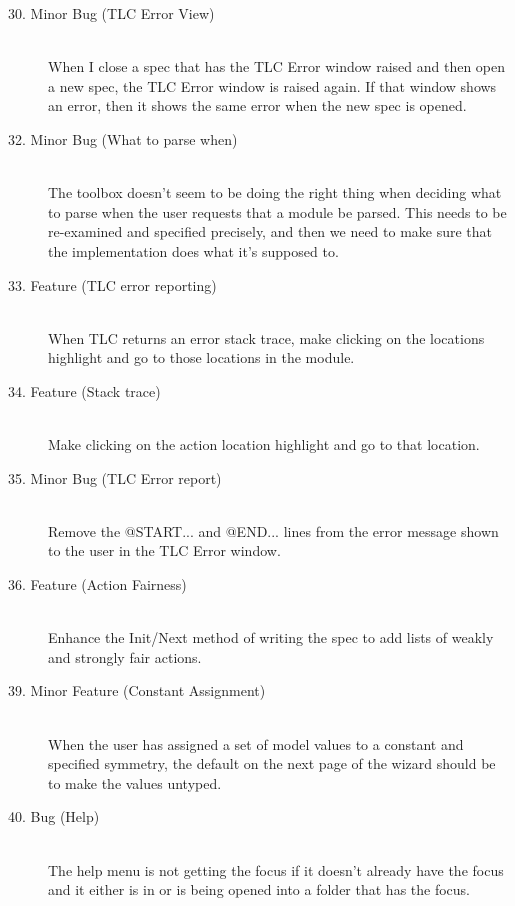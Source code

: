 \documentclass{article}
\begin{document}
\begin{description}
\item[30. Minor Bug (TLC Error View)] \mbox{}\\
%
When I close a spec that has the TLC Error window raised and then open
a new spec, the TLC Error window is raised again.  If that window
shows an error, then it shows the same error when the new spec is
opened.
 
\item[32. Minor Bug (What to parse when)] \mbox{}\\
%
The toolbox doesn't seem to be doing the right thing when deciding
what to parse when the user requests that a module be parsed.  This
needs to be re-examined and specified precisely, and then we need to
make sure that the implementation does what it's supposed to.

\item[33. Feature (TLC error reporting)] \mbox{}\\
%
When TLC returns an error stack trace, make clicking on the locations
highlight and go to those locations in the module.

\item[34. Feature (Stack trace)] \mbox{}\\
%
Make clicking on the action location highlight and go to that
location.
    
\item[35. Minor Bug (TLC Error report)] \mbox{}\\
%
Remove the @START...  and @END...  lines from the error message shown
to the user in the TLC Error window.  

\item[36. Feature (Action Fairness)] \mbox{}\\
%
Enhance the Init/Next method of writing the spec to add lists of
weakly and strongly fair actions.
    
\item[39. Minor Feature (Constant Assignment)] \mbox{}\\
%
When the user has assigned a set of model values to a constant
and specified symmetry, the default on the next page of the wizard
should be to make the values untyped.  

\item[40. Bug (Help)] \mbox{}\\
%
The help menu is not getting the focus if it doesn't already have the
focus and it either is in or is being opened into a folder that has
the focus.



\end{description}
\end{document}
